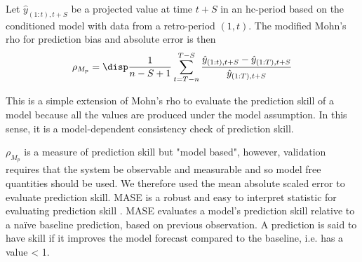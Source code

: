 Let $\hat{y}_{(1:t),t+S}$ be a projected value at time $t+S$ in an hc-period based on the conditioned model with data from a retro-period $(1,t)$. The modified Mohn's rho for prediction bias and absolute error is then
\begin{equation}
\label{eqn:mohn2}
\rho_{M_p} = \disp \frac{1}{n-S+1} \sum_{t=T-n}^{T-S} 
\frac{\hat{y}_{(1:t),t+S}-\hat{y}_{(1:T),t+S}}{\hat{y}_{(1:T),t+S}} 
\end{equation} 

This is a simple extension of Mohn's rho to evaluate the prediction skill of a model because all the values are produced under the model assumption. In this sense, it is a model-dependent consistency check of prediction skill. 


$\rho_{M_p}$ is a measure of prediction skill but "model based", however, validation requires that the system be observable and measurable and so model free quantities should be used. We therefore used the mean absolute scaled error to evaluate prediction skill. MASE is a robust and easy to interpret statistic for evaluating prediction skill \parencite{hyndman2006another}. MASE evaluates a model's prediction skill relative to a na\" {i}ve baseline prediction, based on previous observation. A prediction is said to have skill if it improves the model forecast compared to the baseline, i.e. has a value < 1.
